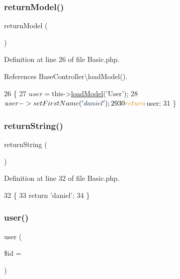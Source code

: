 \subsubsection{\texorpdfstring{return\+Model()}{returnModel()}}
{\footnotesize\ttfamily return\+Model (\begin{DoxyParamCaption}{ }\end{DoxyParamCaption})}



Definition at line 26 of file Basic.\+php.



References Base\+Controller\textbackslash{}load\+Model().


\begin{DoxyCode}
26                                   \{
27         $user = $this->\hyperlink{class_base_controller_a5fa8890bd3a9d20f5c0cc2377dc49eb1}{loadModel}(\textcolor{stringliteral}{'User'});
28         $user->setFirstName(\textcolor{stringliteral}{'daniel'});
29 
30         \textcolor{keywordflow}{return} $user;
31     \}
\end{DoxyCode}
\hypertarget{class_basic_a5bb666dcea19a9561c2047cfa25936bd}{}\label{class_basic_a5bb666dcea19a9561c2047cfa25936bd} 
\subsubsection{\texorpdfstring{return\+String()}{returnString()}}
{\footnotesize\ttfamily return\+String (\begin{DoxyParamCaption}{ }\end{DoxyParamCaption})}



Definition at line 32 of file Basic.\+php.


\begin{DoxyCode}
32                                    \{
33         \textcolor{keywordflow}{return} \textcolor{stringliteral}{'daniel'};
34     \}
\end{DoxyCode}
\hypertarget{class_basic_a6603546e99f9519b86989be128736ad6}{}\label{class_basic_a6603546e99f9519b86989be128736ad6} 
\subsubsection{\texorpdfstring{user()}{user()}}
{\footnotesize\ttfamily user (\begin{DoxyParamCaption}\item[{}]{\$id = {\ttfamily \textquotesingle{}\textquotesingle{}} }\end{DoxyParamCaption})}



